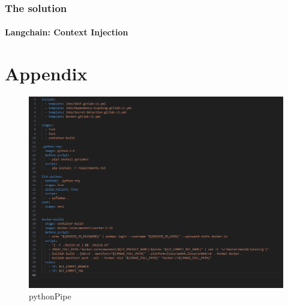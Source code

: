 \documentclass[a4paper,12pt,twoside]{report}
\begin{document}
\subsection{The solution}
\subsubsection{Langchain: Context Injection}

\printglossary[title=Glossary]




\appendix
\appendixpage
\addappheadtotoc
\chapter{Appendix}\label{appendix}
\begin{figure}[h]
		\includegraphics[width=\textwidth, keepaspectratio ]{images/python-yaml}
	\caption[Python CI pipeline]{pythonPipe}
\label{Python Pipeline}
\end{figure}
\printindex
\newpage
{}
\begin{abstract}

\end{abstract}
\end{document}
